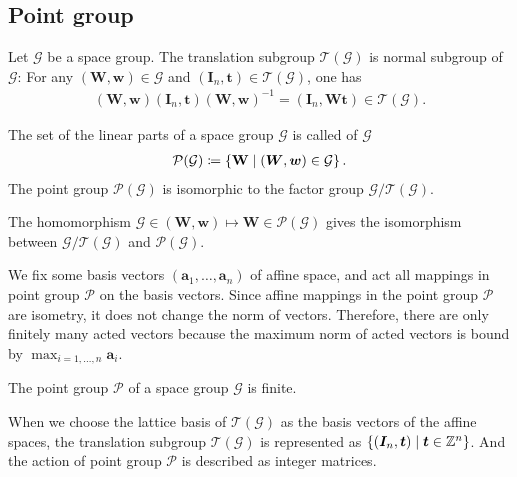 \subsection{Point group}

Let $\mathcal{G}$ be a space group.
The translation subgroup $\mathcal{T}(\mathcal{G})$ is normal subgroup of $\mathcal{G}$:
For any $ (\mathbf{W}, \mathbf{w}) \in \mathcal{G}$ and $(\mathbf{I}_{n}, \mathbf{t}) \in \mathcal{T}(\mathcal{G})$, one has
\begin{align}
  (\bm{W}, \bm{w}) (\bm{I}_{n}, \bm{t}) (\bm{W}, \bm{w})^{-1} = (\bm{I}_{n}, \bm{Wt}) \in \mathcal{T}(\mathcal{G}).
\end{align}

\begin{screen}
  \begin{defn}
    The set of the linear parts of a space group $\mathcal{G}$ is called  of $\mathcal{G}$
    \begin{align}
      \mathcal{P}(\mathcal{G}) \coloneqq \left\{  \mathbf{W}  \mathrel{}\middle|\mathrel{}  (\bm{W}, \bm{w}) \in \mathcal{G}  \right\}.
    \end{align}
    The point group $\mathcal{P}(\mathcal{G})$ is isomorphic to the factor group $\mathcal{G} / \mathcal{T}(\mathcal{G})$.
  \end{defn}
\end{screen}

The homomorphism $\mathcal{G} \in (\bm{W}, \bm{w}) \mapsto \bm{W} \in \mathcal{P}(\mathcal{G})$ gives the isomorphism between $\mathcal{G} / \mathcal{T}(\mathcal{G})$ and $\mathcal{P}(\mathcal{G})$.

We fix some basis vectors $(\bm{a}_{1}, \dots, \bm{a}_{n})$ of affine space, and act all mappings in point group $\mathcal{P}$ on the basis vectors.
Since affine mappings in the point group $\mathcal{P}$ are isometry, it does not change the norm of vectors.
Therefore, there are only finitely many acted vectors because the maximum norm of acted vectors is bound by $\max_{i=1,\dots,n} \mathbf{a}_{i}$.

\begin{screen}
  \begin{them}
    The point group $\mathcal{P}$ of a space group $\mathcal{G}$ is finite.
  \end{them}
\end{screen}

When we choose the lattice basis of $\mathcal{T}(\mathcal{G})$ as the basis vectors of the affine spaces, the translation subgroup $\mathcal{T}(\mathcal{G})$ is represented as $\left\{  (\bm{I}_{n}, \bm{t})  \mathrel{}\middle|\mathrel{}  \bm{t} \in \mathbb{Z}^{n}  \right\}$.
And the action of point group $\mathcal{P}$ is described as integer matrices.

